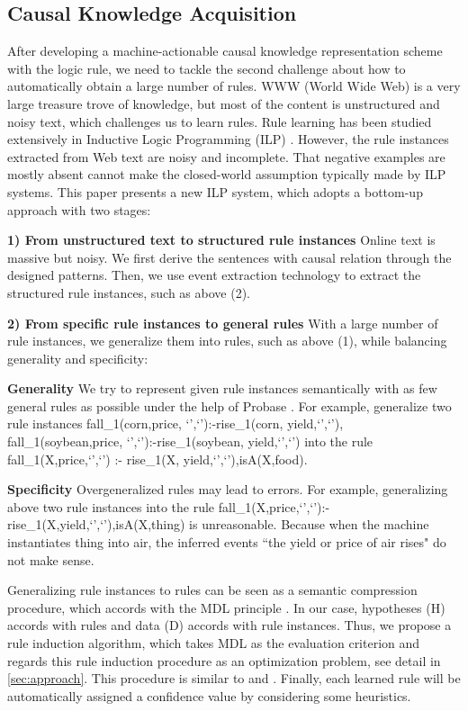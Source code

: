 \subsection{Causal Knowledge Acquisition}
\label{intro:Causal_Knowledge_Mining}
After developing a machine-actionable causal knowledge representation scheme with the logic rule, we need to tackle the second challenge about how to automatically obtain a large number of rules.  
WWW (World Wide Web) is a very large treasure trove of knowledge, but most of the content is unstructured and noisy text, which challenges us to learn rules.
Rule learning has been studied extensively in Inductive Logic Programming (ILP) \cite{Quinlan1990,Muggleton1997}. However, the rule instances extracted from Web text are noisy and incomplete. That negative examples are mostly absent cannot make the closed-world assumption typically made by ILP systems. This paper presents a new ILP system, which adopts a bottom-up approach with two stages:	

\textbf{1) From unstructured text to structured rule instances} Online text is massive but noisy. We first derive the sentences with causal relation through the designed patterns. Then, we use event extraction technology to extract the structured rule instances, such as above (2).
	
\textbf{2) From specific rule instances to general rules} With a large number of rule instances, we generalize them into rules, such as above (1), while balancing generality and specificity:
	
\textbf{Generality} We try to represent given rule instances semantically with as few general rules as possible under the help of Probase \cite{Wu2012a}. For example, generalize two rule instances fall\_1(corn,price, `',`'):-rise\_1(corn, yield,`',`'), fall\_1(soybean,price, `',`'):-rise\_1(soybean, yield,`',`') into the rule fall\_1(X,price,`',`') :- rise\_1(X, yield,`',`'),isA(X,food).


\textbf{Specificity} Overgeneralized  rules may lead to errors. For example,
generalizing above two rule instances into the rule fall\_1(X,price,`',`'):-rise\_1(X,yield,`',`'),isA(X,thing) is unreasonable. Because when the machine instantiates thing into air, the inferred events ``the yield or price of air rises" do not make sense.

Generalizing rule instances to rules can be seen as a semantic compression procedure, which accords with the MDL principle \cite{rissanen1978mdl}. In our case, hypotheses (H) accords with rules and data (D) accords with rule instances. Thus, we propose a rule induction algorithm, which takes MDL as the evaluation criterion and regards this rule induction procedure as an optimization problem, see detail in \ref{sec:approach}. This procedure is similar to \cite{Cui2016} and \cite{Zhu}. Finally, each learned rule will be automatically assigned a confidence value by considering some heuristics.
	

